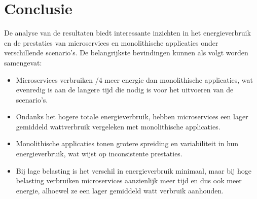 \section{Conclusie}
De analyse van de resultaten biedt interessante inzichten in het energieverbruik en de prestaties van microservices en monolithische applicaties onder verschillende scenario's. De belangrijkste bevindingen kunnen als volgt worden samengevat:
\begin{itemize}
    \item Microservices verbruiken /4 meer energie dan monolithische applicaties, wat evenredig is aan de langere tijd die nodig is voor het uitvoeren van de scenario's.
    \item Ondanks het hogere totale energieverbruik, hebben microservices een lager gemiddeld wattverbruik vergeleken met monolithische applicaties.
    \item Monolithische applicaties tonen grotere spreiding en variabiliteit in hun energieverbruik, wat wijst op inconsistente prestaties.
    \item Bij lage belasting is het verschil in energieverbruik minimaal, maar bij hoge belasting  verbruiken microservices aanzienlijk meer tijd en dus ook meer energie, alhoewel ze een lager gemiddeld watt verbruik aanhouden.
\end{itemize}
